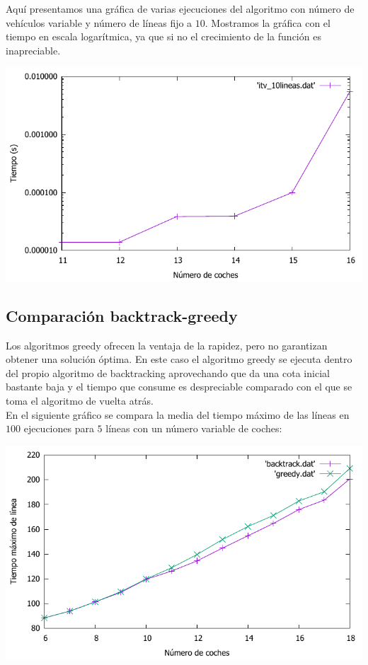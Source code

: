 \documentclass[a4paper, 11pt]{article}
\begin{document}
Aquí presentamos una gráfica de varias ejecuciones del algoritmo con número de vehículos variable y número de líneas fijo a $10$. Mostramos la gráfica con el tiempo en escala logarítmica, ya que si no el crecimiento de la función es inapreciable.

\begin{center}
	\includegraphics[width=\textwidth]{./img/itvEficiencia}
\end{center}

\newpage
\subsection{Comparación backtrack-greedy}

Los algoritmos greedy ofrecen la ventaja de la rapidez, pero no garantizan obtener una solución óptima. En este caso el algoritmo greedy se ejecuta dentro del propio algoritmo de backtracking aprovechando que da una cota inicial bastante baja y el tiempo que consume es despreciable comparado con el que se toma el algoritmo de vuelta atrás. \\

En el siguiente gráfico se compara la media del tiempo máximo de las líneas en $100$ ejecuciones para $5$ líneas con un número variable de coches:

\begin{center}
	\includegraphics[width=\textwidth]{./img/comp}
\end{center}
\end{document}
